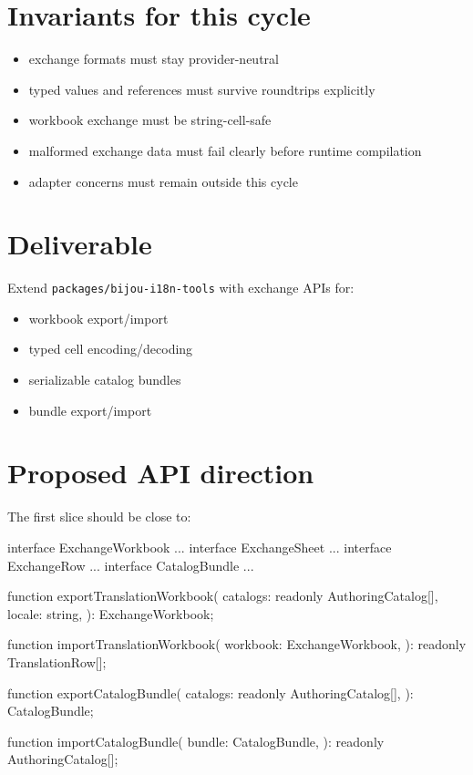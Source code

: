 \section{Invariants for this cycle}\label{record-190-invariants-for-this-cycle}

\begin{itemize}
\tightlist
\item
  exchange formats must stay provider-neutral
\item
  typed values and references must survive roundtrips explicitly
\item
  workbook exchange must be string-cell-safe
\item
  malformed exchange data must fail clearly before runtime compilation
\item
  adapter concerns must remain outside this cycle
\end{itemize}

\section{Deliverable}\label{record-190-deliverable}

Extend \texttt{p\allowbreak{}a\allowbreak{}c\allowbreak{}k\allowbreak{}a\allowbreak{}g\allowbreak{}e\allowbreak{}s\allowbreak{}/\allowbreak{}b\allowbreak{}i\allowbreak{}j\allowbreak{}o\allowbreak{}u\allowbreak{}-\allowbreak{}i\allowbreak{}1\allowbreak{}8\allowbreak{}n\allowbreak{}-\allowbreak{}t\allowbreak{}o\allowbreak{}o\allowbreak{}l\allowbreak{}s} with exchange APIs for:

\begin{itemize}
\tightlist
\item
  workbook export/import
\item
  typed cell encoding/decoding
\item
  serializable catalog bundles
\item
  bundle export/import
\end{itemize}

\section{Proposed API direction}\label{record-190-proposed-api-direction}

The first slice should be close to:

\begin{CodeBlock}
interface ExchangeWorkbook { ... }
interface ExchangeSheet { ... }
interface ExchangeRow { ... }
interface CatalogBundle { ... }

function exportTranslationWorkbook(
  catalogs: readonly AuthoringCatalog[],
  locale: string,
): ExchangeWorkbook;

function importTranslationWorkbook(
  workbook: ExchangeWorkbook,
): readonly TranslationRow[];

function exportCatalogBundle(
  catalogs: readonly AuthoringCatalog[],
): CatalogBundle;

function importCatalogBundle(
  bundle: CatalogBundle,
): readonly AuthoringCatalog[];
\end{CodeBlock}

